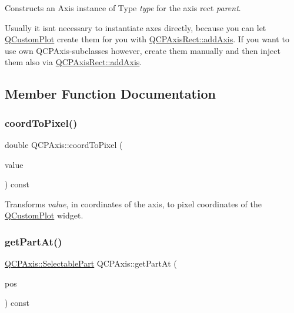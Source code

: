 Constructs an Axis instance of Type {\itshape type} for the axis rect {\itshape parent}.

Usually it isn\textquotesingle{}t necessary to instantiate axes directly, because you can let \hyperlink{class_q_custom_plot}{Q\+Custom\+Plot} create them for you with \hyperlink{class_q_c_p_axis_rect_a2dc336092ccc57d44a46194c8a23e4f4}{Q\+C\+P\+Axis\+Rect\+::add\+Axis}. If you want to use own Q\+C\+P\+Axis-\/subclasses however, create them manually and then inject them also via \hyperlink{class_q_c_p_axis_rect_a2dc336092ccc57d44a46194c8a23e4f4}{Q\+C\+P\+Axis\+Rect\+::add\+Axis}. 

\subsection{Member Function Documentation}
\mbox{\label{class_q_c_p_axis_af15d1b3a7f7e9b53d759d3ccff1fe4b4}} 
\subsubsection{\texorpdfstring{coord\+To\+Pixel()}{coordToPixel()}}
{\footnotesize\ttfamily double Q\+C\+P\+Axis\+::coord\+To\+Pixel (\begin{DoxyParamCaption}\item[{double}]{value }\end{DoxyParamCaption}) const}

Transforms {\itshape value}, in coordinates of the axis, to pixel coordinates of the \hyperlink{class_q_custom_plot}{Q\+Custom\+Plot} widget. \mbox{\label{class_q_c_p_axis_a22ab2d71d7341b9b3974c0dd10619af2}} 
\subsubsection{\texorpdfstring{get\+Part\+At()}{getPartAt()}}
{\footnotesize\ttfamily \hyperlink{class_q_c_p_axis_abee4c7a54c468b1385dfce2c898b115f}{Q\+C\+P\+Axis\+::\+Selectable\+Part} Q\+C\+P\+Axis\+::get\+Part\+At (\begin{DoxyParamCaption}\item[{const Q\+PointF \&}]{pos }\end{DoxyParamCaption}) const}


